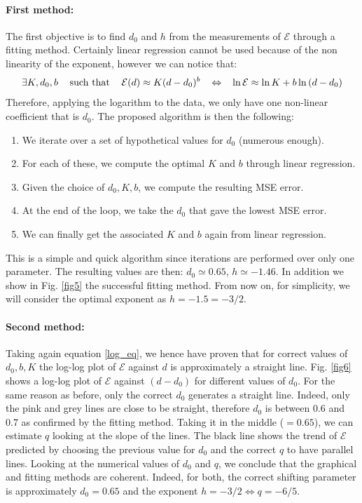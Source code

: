 \documentclass[11pt,titlepage]{article}
\begin{document}
\paragraph{First method:}
The first objective is to find $d_0$ and $h$ from the measurements of $\mathcal{E}$ through a fitting method. Certainly linear regression cannot be used because of the non linearity of the exponent, however we can notice that:
\begin{equation}\label{log_eq}
	\exists K, d_0, b \hspace{3mm} \text{ such that } \hspace{3mm} \mathcal{E}(d) \approx K(d-d_0)^b \hspace{3mm} \Leftrightarrow \hspace{3mm} \ln{\mathcal{E}} \approx \ln{K} + b \ln{(d-d_0)}
\end{equation}
Therefore, applying the logarithm to the data, we only have one non-linear coefficient that is $d_0$. The proposed algorithm is then the following: 
\begin{enumerate}
	\item We iterate over a set of hypothetical values for $d_0$ (numerous enough).
	\item For each of these, we compute the optimal $K$ and $b$ through linear regression.
	\item Given the choice of $d_0,K,b$, we compute the resulting MSE error.
	\item At the end of the loop, we take the $d_0$ that gave the lowest MSE error.
	\item We can finally get the associated $K$ and $b$ again from linear regression.
\end{enumerate}
	This is a simple and quick algorithm since iterations are performed over only one parameter. The resulting values are then: $d_0 \simeq 0.65$, $h \simeq -1.46$. In addition we show in Fig. \ref{fig5} the successful fitting method. From now on,  for simplicity, we will consider the optimal exponent as $h=-1.5 = -3/2$. 

\paragraph{Second method:}
Taking again equation \ref{log_eq}, we hence have proven that for correct values of $d_0,b,K$ the log-log plot of $\mathcal{E}$ against $d$ is approximately a straight line. Fig. \ref{fig6} shows a  log-log plot of $\mathcal{E}$ against $(d-d_0)$ for different values of $d_0$. For the same reason as before, only the correct $d_0$ generates a straight line. Indeed, only the pink and grey lines are close to be straight, therefore $d_0$ is between 0.6 and 0.7 as confirmed by the fitting method. Taking it in the middle ($=0.65$), we can estimate $q$ looking at the slope of the lines. The black line shows the trend of $\mathcal{E}$ predicted by choosing the previous value for $d_0$ and the correct $q$ to have parallel lines. Looking at the numerical values of $d_0$ and $q$, we conclude that the graphical and fitting methods are coherent. Indeed, for both, the correct shifting parameter is approximately $d_0=0.65$ and the exponent $h=-3/2 \Leftrightarrow q = -6/5$. 
\end{document}
